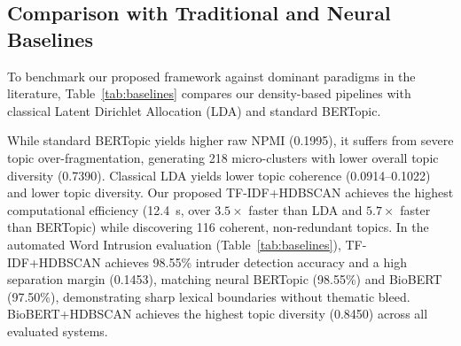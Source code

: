 \documentclass[a4paper,fleqn]{cas-dc}
\begin{document}
\subsection{Comparison with Traditional and Neural Baselines}

To benchmark our proposed framework against dominant paradigms in the literature, Table~\ref{tab:baselines} compares our density-based pipelines with classical Latent Dirichlet Allocation (LDA) and standard BERTopic.

\begin{table}[t]
\centering
\caption{Topic modeling benchmark against classical and neural baselines.}
\label{tab:baselines}
\end{table}

While standard BERTopic yields higher raw NPMI (0.1995), it suffers from severe topic over-fragmentation, generating 218 micro-clusters with lower overall topic diversity (0.7390). Classical LDA yields lower topic coherence (0.0914--0.1022) and lower topic diversity. Our proposed TF-IDF+HDBSCAN achieves the highest computational efficiency (12.4~s, over $3.5\times$ faster than LDA and $5.7\times$ faster than BERTopic) while discovering 116 coherent, non-redundant topics. In the automated Word Intrusion evaluation (Table~\ref{tab:baselines}), TF-IDF+HDBSCAN achieves 98.55\% intruder detection accuracy and a high separation margin (0.1453), matching neural BERTopic (98.55\%) and BioBERT (97.50\%), demonstrating sharp lexical boundaries without thematic bleed. BioBERT+HDBSCAN achieves the highest topic diversity (0.8450) across all evaluated systems.
\end{document}
